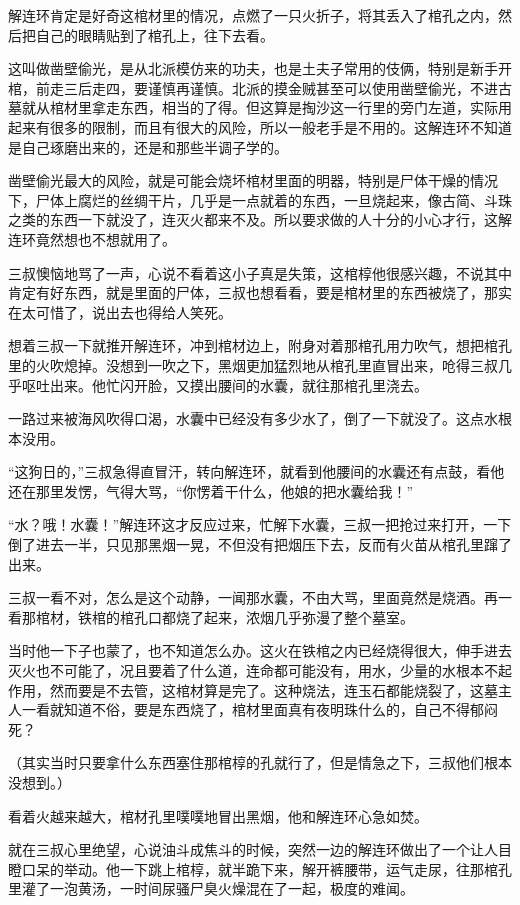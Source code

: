 解连环肯定是好奇这棺材里的情况，点燃了一只火折子，将其丢入了棺孔之内，然后把自己的眼睛贴到了棺孔上，往下去看。

这叫做凿壁偷光，是从北派模仿来的功夫，也是土夫子常用的伎俩，特别是新手开棺，前走三后走四，要谨慎再谨慎。北派的摸金贼甚至可以使用凿壁偷光，不进古墓就从棺材里拿走东西，相当的了得。但这算是掏沙这一行里的旁门左道，实际用起来有很多的限制，而且有很大的风险，所以一般老手是不用的。这解连环不知道是自己琢磨出来的，还是和那些半调子学的。

凿壁偷光最大的风险，就是可能会烧坏棺材里面的明器，特别是尸体干燥的情况下，尸体上腐烂的丝绸干片，几乎是一点就着的东西，一旦烧起来，像古简、斗珠之类的东西一下就没了，连灭火都来不及。所以要求做的人十分的小心才行，这解连环竟然想也不想就用了。

三叔懊恼地骂了一声，心说不看着这小子真是失策，这棺椁他很感兴趣，不说其中肯定有好东西，就是里面的尸体，三叔也想看看，要是棺材里的东西被烧了，那实在太可惜了，说出去也得给人笑死。

想着三叔一下就推开解连环，冲到棺材边上，附身对着那棺孔用力吹气，想把棺孔里的火吹熄掉。没想到一吹之下，黑烟更加猛烈地从棺孔里直冒出来，呛得三叔几乎呕吐出来。他忙闪开脸，又摸出腰间的水囊，就往那棺孔里浇去。

一路过来被海风吹得口渴，水囊中已经没有多少水了，倒了一下就没了。这点水根本没用。

“这狗日的，”三叔急得直冒汗，转向解连环，就看到他腰间的水囊还有点鼓，看他还在那里发愣，气得大骂，“你愣着干什么，他娘的把水囊给我！”

“水？哦！水囊！”解连环这才反应过来，忙解下水囊，三叔一把抢过来打开，一下倒了进去一半，只见那黑烟一晃，不但没有把烟压下去，反而有火苗从棺孔里蹿了出来。

三叔一看不对，怎么是这个动静，一闻那水囊，不由大骂，里面竟然是烧酒。再一看那棺材，铁棺的棺孔口都烧了起来，浓烟几乎弥漫了整个墓室。

当时他一下子也蒙了，也不知道怎么办。这火在铁棺之内已经烧得很大，伸手进去灭火也不可能了，况且要着了什么道，连命都可能没有，用水，少量的水根本不起作用，然而要是不去管，这棺材算是完了。这种烧法，连玉石都能烧裂了，这墓主人一看就知道不俗，要是东西烧了，棺材里面真有夜明珠什么的，自己不得郁闷死？

（其实当时只要拿什么东西塞住那棺椁的孔就行了，但是情急之下，三叔他们根本没想到。）

看着火越来越大，棺材孔里噗噗地冒出黑烟，他和解连环心急如焚。

就在三叔心里绝望，心说油斗成焦斗的时候，突然一边的解连环做出了一个让人目瞪口呆的举动。他一下跳上棺椁，就半跪下来，解开裤腰带，运气走尿，往那棺孔里灌了一泡黄汤，一时间尿骚尸臭火燥混在了一起，极度的难闻。

